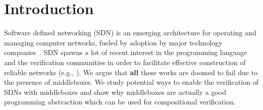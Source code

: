 \section{Introduction}

Software defined networking (SDN) is an emerging architecture for
operating and managing computer networks, fueled by adoption by major
technology companies~\cite{SIGCOMM:Jain13}.
SDN spawns a lot of recent interest in the programming language and the verification communities in order to facilitate effective construction of
reliable networks (e.g., \cite{FlowLog,monsanto2012compiler,Verificare,FMACAD:SNM13,VeiCon,Majumdar:2014}).
We argue that \textbf{all} these works are doomed to fail due to the presence of middleboxes.
We study potential ways to enable the verification of SDNs with middleboxes and show why middleboxes are actually a good programming abstraction which
can be used for compositional verification.

